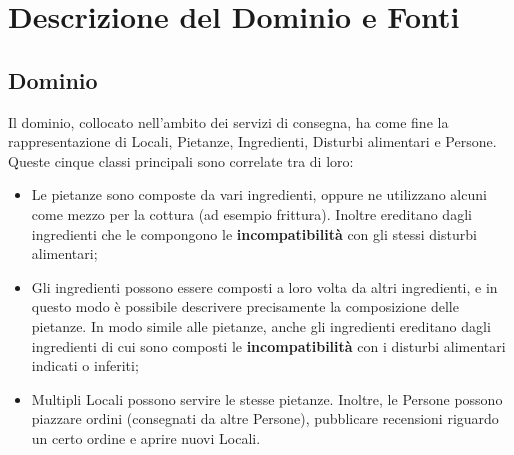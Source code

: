\documentclass[12pt]{article}
\begin{document}
\section{Descrizione del Dominio e Fonti}
\subsection{Dominio}
Il dominio, collocato nell'ambito dei servizi di consegna, ha come fine la rappresentazione di Locali, Pietanze, Ingredienti, Disturbi alimentari e Persone.\newline
Queste cinque classi principali sono correlate tra di loro:
\begin{itemize}
    \item Le pietanze sono composte da vari ingredienti, oppure ne utilizzano alcuni come mezzo per la cottura (ad esempio frittura). Inoltre ereditano dagli ingredienti che le compongono le \textbf{incompatibilità} con gli stessi disturbi alimentari;
    \item Gli ingredienti possono essere composti a loro volta da altri ingredienti, e in questo modo è possibile descrivere precisamente la composizione delle pietanze. In modo simile alle pietanze, anche gli ingredienti ereditano dagli ingredienti di cui sono composti le \textbf{incompatibilità} con i disturbi alimentari indicati o inferiti;
    \item Multipli Locali possono servire le stesse pietanze. Inoltre, le Persone possono piazzare ordini (consegnati da altre Persone), pubblicare recensioni riguardo un certo ordine e aprire nuovi Locali.
\end{itemize}
\end{document}
